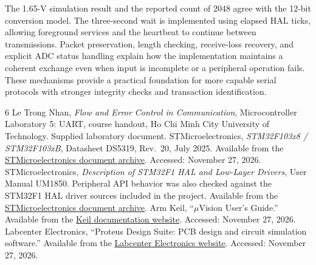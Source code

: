\documentclass[a4paper]{article}
\begin{document}
The 1.65-V simulation result and the reported count of 2048 agree with the
12-bit conversion model. The three-second wait is implemented using elapsed
HAL ticks, allowing foreground services and the heartbeat to continue between
transmissions. Packet preservation, length checking, receive-loss recovery,
and explicit ADC status handling explain how the implementation maintains a
coherent exchange even when input is incomplete or a peripheral operation
fails. These mechanisms provide a practical foundation for more capable
serial protocols with stronger integrity checks and transaction identification.


\clearpage
{}
{}
\begin{thebibliography}{6}
Le Trong Nhan, \emph{Flow and Error Control in Communication},
Microcontroller Laboratory 5: UART, course handout, Ho Chi Minh City
University of Technology. Supplied laboratory document.
STMicroelectronics, \emph{STM32F103x8 / STM32F103xB},
Datasheet DS5319, Rev.~20, July 2025. Available from the
\href{https://www.st.com/resource/en/datasheet/stm32f103c8.pdf}
{STMicroelectronics document archive}. Accessed: November 27, 2026.
STMicroelectronics, \emph{Description of STM32F1 HAL and Low-Layer Drivers},
User Manual UM1850. Peripheral API behavior was also checked against the
STM32F1 HAL driver sources included in the project. Available from the
\href{https://www.st.com/resource/en/user_manual/um1850-description-of-stm32f1-hal-and-lowlayer-drivers-stmicroelectronics.pdf}
{STMicroelectronics document archive}.
Arm Keil, ``\mbox{$\mu$Vision} User's Guide.'' Available from the
\href{https://www.keil.com/support/man/docs/uv4/default.htm}
{Keil documentation website}. Accessed: November 27, 2026.
Labcenter Electronics, ``Proteus Design Suite: PCB design and circuit
simulation software.'' Available from the
\href{https://www.labcenter.com/}{Labcenter Electronics website}.
Accessed: November 27, 2026.
\end{thebibliography}
\end{document}

